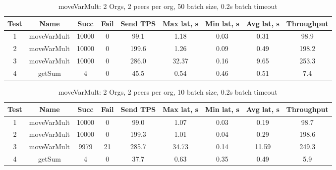 \begin{appendices}
\begin{table}[h!]
\begin{center}
\begin{tabular}{ |c|c|c|c|c|c|c|c|c| }
 \hline
  Test & Name & Succ  & Fail & Send TPS & Max lat, s & Min lat, s & Avg lat, s & Throughput \\
 \hline
 \hline
 1    & moveVarMult & 10000 & 0    & 99.1  & 1.18      & 0.03      & 0.31      & 98.9  \\
 \hline
 2    & moveVarMult & 10000 & 0    & 199.6 & 1.26      & 0.09      & 0.49      & 198.2 \\
 \hline
 3    & moveVarMult & 10000 & 0    & 286.0 & 32.37     & 0.16      & 9.65      & 253.3 \\
 \hline
 4    & getSum      & 4     & 0    & 45.5  & 0.54      & 0.46      & 0.51      & 7.4   \\
 \hline
\end{tabular}
\end{center}
\caption{moveVarMult: 2 Orgs, 2 peers per org, 50 batch size, 0.2s batch timeout}
\end{table}

\begin{table}[h!]
\begin{center}
\begin{tabular}{ |c|c|c|c|c|c|c|c|c| }
 \hline
  Test & Name & Succ  & Fail & Send TPS & Max lat, s & Min lat, s & Avg lat, s & Throughput \\
 \hline
 \hline
 1    & moveVarMult & 10000 & 0    & 99.0  & 1.07      & 0.03      & 0.19      & 98.7   \\
 \hline
 2    & moveVarMult & 10000 & 0    & 199.3 & 1.01      & 0.04      & 0.29      & 198.6  \\
 \hline
 3    & moveVarMult & 9979  & 21   & 285.7 & 34.73     & 0.14      & 11.59     & 249.3  \\
 \hline
 4    & getSum      & 4     & 0    & 37.7  & 0.63      & 0.35      & 0.49      & 5.9    \\
 \hline
\end{tabular}
\end{center}
\caption{moveVarMult: 2 Orgs, 2 peers per org, 10 batch size, 0.2s batch timeout}
\end{table}


\end{appendices}
